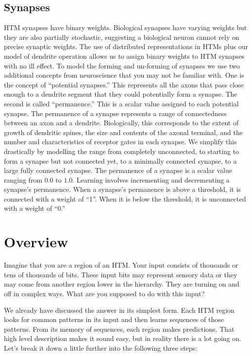 \subsection*{Synapses}

HTM synapses have binary weights. Biological synapses have varying
weights but they are also partially stochastic, suggesting a
biological neuron cannot rely on precise synaptic weights. The use of
distributed representations in HTMs plus our model of dendrite
operation allows us to assign binary weights to HTM synapses with no
ill effect. To model the forming and un-forming of synapses we use two
additional concepts from neuroscience that you may not be familiar
with. One is the concept of ``potential synapses.'' This represents
all the axons that pass close enough to a dendrite segment that they
could potentially form a synapse. The second is called ``permanence.''
This is a scalar value assigned to each potential synapse. The
permanence of a synapse represents a range of connectedness between an
axon and a dendrite. Biologically, this corresponds to the extent of growth
of dendritic spines, the size and contents of the axonal terminal, and 
the number and characteristics of receptor gates in each synapse.
We simplify this drastically by modelling the range from completely
unconnected, to starting to form a synapse but not connected yet, to a
minimally connected synapse, to a large fully connected synapse. The
permanence of a synapse is a scalar value ranging from $0.0$ to
$1.0$. Learning involves incrementing and decrementing a synapse's
permanence. When a synapse's permanence is above a threshold, it is
connected with a weight of ``1''. When it is below the threshold, it
is unconnected with a weight of ``0.''

\section*{Overview}

Imagine that you are a region of an HTM. Your input consists of
thousands or tens of thousands of bits. These input bits may represent
sensory data or they may come from another region lower in the
hierarchy. They are turning on and off in complex ways. What are you
supposed to do with this input?

We already have discussed the answer in its simplest form. Each HTM
region looks for common patterns in its input and then learns
sequences of those patterns. From its memory of sequences, each region
makes predictions. That high level description makes it sound easy,
but in reality there is a lot going on. Let's break it down a little
further into the following three steps:

